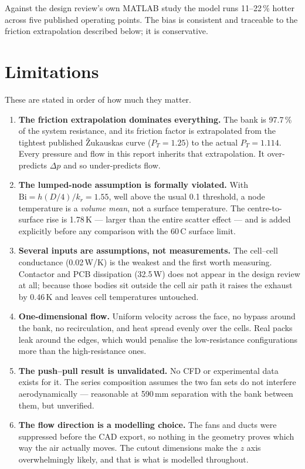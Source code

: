 \documentclass[11pt,a4paper]{article}
\newcommand{\qty}[2]{#1\,#2}
\begin{document}
Against the design review's own MATLAB study the model runs
\qty{11--22}{\%} hotter across five published operating points. The
bias is consistent and traceable to the friction extrapolation described below;
it is conservative.

\section{Limitations}

These are stated in order of how much they matter.

\begin{enumerate}[leftmargin=*]
\item \textbf{The friction extrapolation dominates everything.} The bank is
\qty{97.7}{\%} of the system resistance, and its friction factor is
extrapolated from the tightest published Žukauskas curve ($P_T = 1.25$) to the
actual $P_T = 1.114$. Every pressure and flow in this report inherits that
extrapolation. It over-predicts $\Delta p$ and so under-predicts flow.

\item \textbf{The lumped-node assumption is formally violated.} With
$\mathrm{Bi} = h(D/4)/k_r = 1.55$, well above the usual 0.1
threshold, a node temperature is a \emph{volume mean}, not a surface
temperature. The centre-to-surface rise is \qty{1.78}{K} --- larger than
the entire scatter effect --- and is added explicitly before any comparison with
the \qty{60}{\textdegree C} surface limit.

\item \textbf{Several inputs are assumptions, not measurements.} The cell--cell
conductance (\qty{0.02}{W/K}) is the weakest and the first worth
measuring. Contactor and PCB dissipation (\qty{32.5}{W}) does not appear in
the design review at all; because those bodies sit outside the cell air path it
raises the exhaust by \qty{0.46}{K} and leaves cell temperatures untouched.

\item \textbf{One-dimensional flow.} Uniform velocity across the face, no
bypass around the bank, no recirculation, and heat spread evenly over the cells.
Real packs leak around the edges, which would penalise the low-resistance
configurations more than the high-resistance ones.

\item \textbf{The push--pull result is unvalidated.} No CFD or experimental
data exists for it. The series composition assumes the two fan sets do not
interfere aerodynamically --- reasonable at \qty{590}{mm} separation
with the bank between them, but unverified.

\item \textbf{The flow direction is a modelling choice.} The fans and ducts were
suppressed before the CAD export, so nothing in the geometry proves which way
the air actually moves. The cutout dimensions make the $z$ axis overwhelmingly
likely, and that is what is modelled throughout.
\end{enumerate}
\end{document}
